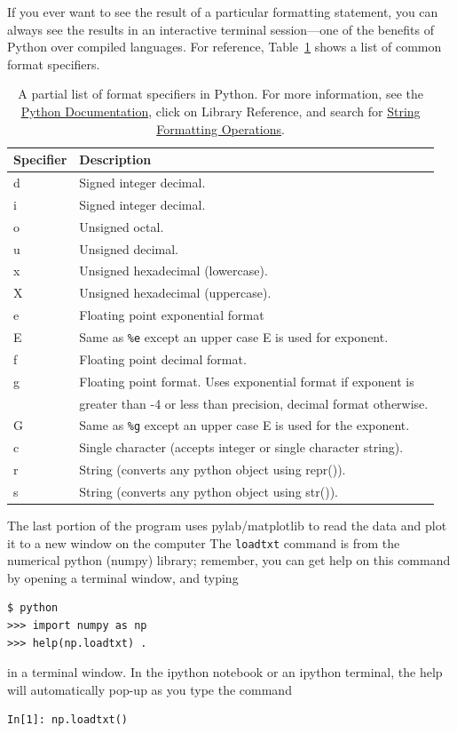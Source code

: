 If you ever want to see the result of a particular formatting statement, you can always see the results in an interactive terminal session---one of the benefits of Python over compiled languages. For reference,  Table~\ref{tab:FormatSpecifiers} shows a list of common format specifiers.
\begin{table}
\centering
\caption{A partial list of format specifiers in Python. For more information, see the \href{http://docs.python.org/}{Python Documentation}, click on Library
Reference, and search for \href{http://docs.python.org/lib/typesseq-strings.html}{String Formatting Operations}. }
\label{tab:FormatSpecifiers}       %
\begin{tabular}{ll}
\toprule
Specifier\hspace*{7mm} & Description  \\
\midrule
d&	Signed integer decimal.	\\
i&	Signed integer decimal.	\\
o&	Unsigned octal.\\
u&	Unsigned decimal.\\	
x&	Unsigned hexadecimal (lowercase).\\
X&	Unsigned hexadecimal (uppercase).\\
e&	Floating point exponential format \\
E&  Same as \verb!%e! except an upper case E is used for exponent.\\
f&	Floating point decimal format.\\
g&	Floating point format. Uses exponential format if exponent is\\
 & greater than -4 or less than precision, decimal format otherwise.\\
G&  Same as \verb!%g! except an upper case E is used for the exponent.\\
c&	Single character (accepts integer or single character string).	\\
r&	String (converts any python object using repr()).	\\
s&	String (converts any python object using str()).\\
\bottomrule
\end{tabular}
\end{table}
%

The last portion of the program uses pylab/matplotlib to read the data and plot it to a new window on the computer The \verb!loadtxt! command is from the numerical python (numpy) library; remember, you can get help on this command by opening a terminal window, and typing 
\begin{verbatim}
$ python
>>> import numpy as np
>>> help(np.loadtxt) .
\end{verbatim}
in a terminal window. In the ipython notebook or an ipython terminal, the help will automatically pop-up as you type the command
\begin{verbatim}
In[1]: np.loadtxt()
\end{verbatim}

